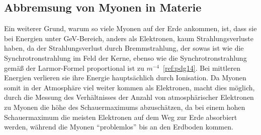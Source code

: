 \documentclass[a4paper,ngerman]{scrartcl}
\begin{document}


\subsection{Abbremsung von Myonen in Materie}
\label{sec:wwmitmaterie}
Ein weiterer Grund, warum so viele Myonen auf der Erde ankommen, ist, dass sie bei Energien unter GeV-Bereich, anders als Elektronen,
kaum Strahlungsverluste haben, da der Strahlungsverlust durch Bremmstrahlung, der sowas ist wie die Synchrotronstrahlung im Feld der Kerne,
ebenso wie die Synchrotronstrahlung gemäß der Larmor-Formel proportional ist zu $m^{-4}$~\ref{ref:pdg14}. 
Bei mittleren Energien verlieren sie ihre Energie hauptsächlich durch Ionisation. 
Da Myonen somit in der Atmosphäre viel weiter kommen als Elektronen, macht dies möglich, durch die Messung des Verhältnisses der Anzahl von atmosphärischer Elektronen zu Myonen die höhe des Schauermaximums abzuschätzen, da bei einem hohen Schauermaximum die meisten Elektronen auf dem Weg zur Erde absorbiert werden, während die Myonen "`problemlos"' bis an den Erdboden kommen.\\
\end{document}
